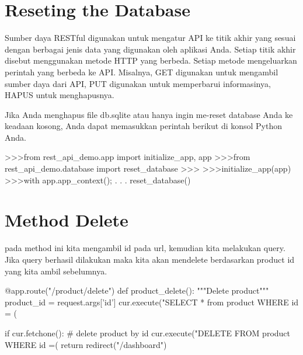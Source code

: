 \section{Reseting the Database}
Sumber daya RESTful digunakan untuk mengatur API ke titik akhir yang sesuai dengan berbagai jenis data yang digunakan oleh aplikasi Anda. Setiap titik akhir disebut menggunakan metode HTTP yang berbeda. Setiap metode mengeluarkan perintah yang berbeda ke API. Misalnya, GET digunakan untuk mengambil sumber daya dari API, PUT digunakan untuk memperbarui informasinya, HAPUS untuk menghapusnya.

Jika Anda menghapus file db.sqlite atau hanya ingin me-reset database Anda ke keadaan kosong, Anda dapat memasukkan perintah berikut di konsol Python Anda.

	>>>from rest_api_demo.app import initialize_app, app
	>>>from rest_api_demo.database import reset_database
	>>>
	>>>initialize_app(app)
	>>>with app.app_context();
	. . .	reset_database()

\section{Method Delete}
pada method ini kita mengambil id pada url, kemudian kita melakukan query. Jika query berhasil dilakukan maka kita akan mendelete berdasarkan product id yang kita ambil sebelumnya.

@app.route("/product/delete")
def product_delete():
    """Delete product"""
    product_id = request.args['id']
    cur.execute("SELECT * from product WHERE id = (%

    if cur.fetchone():
        # delete product by id
        cur.execute("DELETE FROM product WHERE id =(%
    return redirect("/dashboard")



